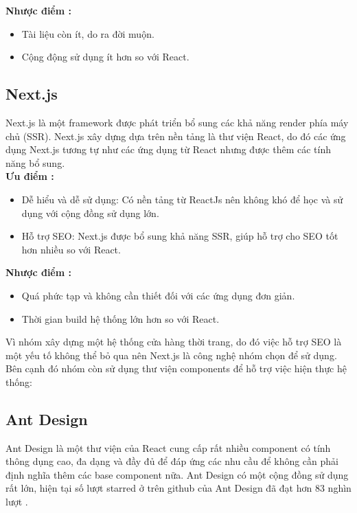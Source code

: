 \textbf{Nhược điểm \cite{technologyFE}:}
\begin{itemize}
    \item Tài liệu còn ít, do ra đời muộn.
    \item Cộng động sử dụng ít hơn so với React.
\end{itemize}

\subsection{Next.js}

\hspace*{0.5cm} Next.js là một framework được phát triển bổ sung các khả năng render phía máy chủ (SSR). Next.js xây dựng dựa trên nền tảng là thư viện React, do đó các ứng dụng Next.js tương tự như các ứng dụng từ React nhưng được thêm các tính năng bổ sung.\\


\textbf{Ưu điểm \cite{technologyNextAdvance}:}
\begin{itemize}
    \item Dễ hiểu và dễ sử dụng: Có nền tảng từ ReactJs nên không khó để học và sử dụng với cộng đồng sử dụng lớn.
    \item Hỗ trợ SEO: Next.js được bổ sung khả năng SSR, giúp hỗ trợ cho SEO tốt hơn nhiều so với React.
\end{itemize}

\textbf{Nhược điểm \cite{technologyNextAdvance}:}
\begin{itemize}
    \item Quá phức tạp và không cần thiết đối với các ứng dụng đơn giản.
    \item Thời gian build hệ thống lớn hơn so với React.
\end{itemize}

Vì nhóm xây dựng một hệ thống cửa hàng thời trang, do đó việc hỗ trợ SEO là một yếu tố không thể bỏ qua nên Next.js là công nghệ nhóm chọn để sử dụng. \\

Bên cạnh đó nhóm còn sử dụng thư viện components để hỗ trợ việc hiện thực hệ thống:

\subsection*{Ant Design}
\hspace*{0.5cm} Ant Design là một thư viện của React cung cấp rất nhiều component có tính thông dụng cao, đa dạng và đầy đủ để đáp ứng các nhu cầu để không cần phải định nghĩa thêm các base component nữa. Ant Design có một cộng đồng sử dụng rất lớn, hiện tại số lượt starred ở trên github của Ant Design đã đạt hơn 83 nghìn lượt \cite{technologyAntdStar}.

